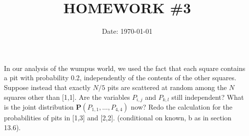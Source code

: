 \documentclass[cn,12pt]{homework}
\title{HOMEWORK \#3} %
\date{Date: \today} %
\institute{ZHEJIANG UNIVERSITY\quad COLLEGE OF INFORMATION SCIENCE AND ELECTRONICS ENGINEERING} %
\begin{document}
\maketitle



\begin{problem}
In our analysis of the wumpus world, 
we used the fact that each square contains a pit with probability 0.2, 
independently of the contents of the other squares. 
Suppose instead that exactly $N/5$ pits are scattered at random among 
the $N$ squares other than [1,1]. Are the variables $P_{i,j}$ and $P_{k,l}$ 
still independent? What is the joint distribution 
$\mathbf{P}(P_{1,1},\ldots,P_{4,4})$ now? Redo the calculation 
for the probabilities of pits in [1,3] and [2,2].
(conditional on known, b as in section 13.6).


\end{problem}
\end{document}
